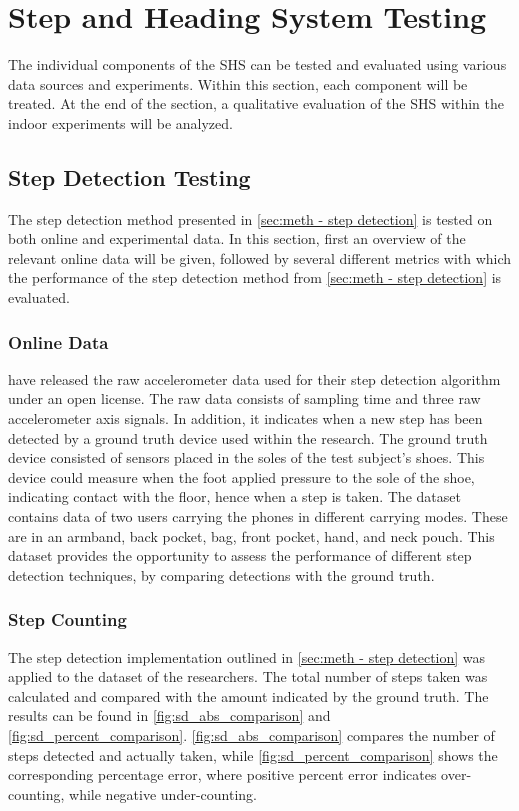\section[SHS Testing]{Step and Heading System Testing}
\label{sec:results-SHS}
The individual components of the \acl{SHS} can be tested and evaluated using various data sources and experiments. Within this section, each component will be treated. At the end of the section, a qualitative evaluation of the \ac{SHS} within the indoor experiments will be analyzed. 

\subsection{Step Detection Testing}
\label{sec:results-step_detection}
The step detection method presented in \cref{sec:meth - step detection} is tested on both online and experimental data. In this section, first an overview of the relevant online data will be given, followed by several different metrics with which the performance of the step detection method from \cref{sec:meth - step detection} is evaluated. 


\subsubsection{Online Data}
\citet{Salvi2018} have released the raw accelerometer data used for their step detection algorithm under an open license. The raw data consists of sampling time and three raw accelerometer axis signals. In addition, it indicates when a new step has been detected by a ground truth device used within the research. The ground truth device consisted of sensors placed in the soles of the test subject's shoes. This device could measure when the foot applied pressure to the sole of the shoe, indicating contact with the floor, hence when a step is taken. The dataset contains data of two users carrying the phones in different carrying modes. These are in an armband, back pocket, bag, front pocket, hand, and neck pouch. This dataset provides the opportunity to assess the performance of different step detection techniques, by comparing detections with the ground truth.\par

\subsubsection{Step Counting}

The step detection implementation outlined in \cref{sec:meth - step detection} was applied to the dataset of the researchers. The total number of steps taken was calculated and compared with the amount indicated by the ground truth. The results can be found in  \cref{fig:sd_abs_comparison} and \cref{fig:sd_percent_comparison}. \cref{fig:sd_abs_comparison} compares the number of steps detected and actually taken, while \cref{fig:sd_percent_comparison}  shows the corresponding percentage error, where positive percent error indicates over-counting, while negative under-counting. \par 

